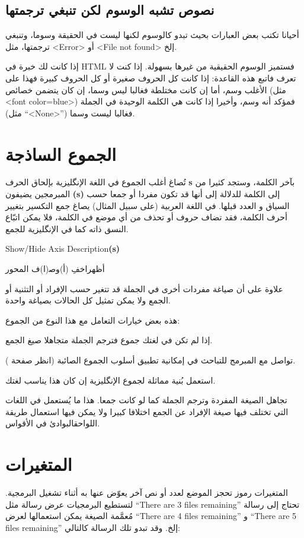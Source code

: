 \subsection{نصوص تشبه الوسوم لكن تنبغي ترجمتها}
أحيانا تكتب بعض العبارات بحيث تبدو كالوسوم لكنها ليست في الحقيقة وسوما،
وتنبغي ترجمتها، مثل <Error> أو <File not found> إلخ.

إذا كانت لك خبرة في HTML فستميز الوسوم الحقيقية من غيرها بسهولة. إذا كنت
لا تعرف فاتبع هذه القاعدة: إذا كانت كل الحروف صغيرة أو كل الحروف كبيرة
فهذا على الأغلب وسم، أما إن كانت مختلطة فغالبا ليس وسما، إن كان يتضمن
خصائص (مثل <font color=blue>) فمؤكد أنه وسم، وأخيرا إذا كانت هي الكلمة
الوحيدة في الجملة (مثل “<None>”) فغالبا ليست وسما.

\section{الجموع الساذجة}
تُصاغ أغلب الجموع في اللغة الإنگليزية بإلحاق الحرف {\bf s} بآخر الكلمة،
وستجد كثيرا من المبرمجين يضيفون {\bf (s)} إلى الكلمة للدلالة إلى أنها
قد تكون مفردا أو جمعا حسب السياق و العدد قبلها. في اللغة العربية (على
سبيل المثال) يصاغ جمع التكسير بتغيير أحرف الكلمة، فقد تضاف حروف أو تحذف
من أي موضع في الكلمة، فلا يمكن اتبّاع النسق ذاته كما في الإنگليزية
للجمع.

Show/Hide Axis Description{\bf (s)}

أظهر اخفِ (أ)وص‍(ا)ف المحور

علاوة على أن صياغة مفردات أخرى في الجملة قد تتغير حسب الإفراد أو التثنية
أو الجمع ولا يمكن تمثيل كل الحالات بصياغة واحدة.

هذه بعض خيارات التعامل مع هذا النوع من الجموع:

\startitemize[n]
\item إذا لم تكن في لغتك جموع فترجم الجملة متجاهلا صيغ الجمع.
\item تواصل مع المبرمج للتباحث في إمكانية تطبيق أسلوب الجموع الصائبة
(انظر صفحة \at[ref:33482409]).
\item استعمل بُنية مماثلة لجموع الإنگليزية إن كان هذا يناسب لغتك.
\item تجاهل الصيغة المفردة وترجم الجملة كما لو كانت جمعا. هذا ما يُستعمل
في اللغات التي تختلف فيها صيغة الإفراد عن الجمع اختلافا كبيرا ولا يمكن
فيها استعمال طريقة اللواحق البوادئ في الأقواس.
\stopitemize
\section[ref:33556809]{المتغيرات}
المتغيرات رموز تحجز الموضع لعدد أو
نص آخر يعوّض عنها به أثناء تشغيل البرمجية. لتستطيع البرمجيات عرض رسالة
مثل “There are 3 files remaining” تحتاج إلى رسالة مُعمَّمة الصيغة يمكن
استعمالها لعرض “There are 4 files remaining” و “There are 5 files
remaining” إلخ. وقد تبدو تلك الرسالة كالتالي:

